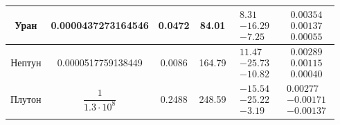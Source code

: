 \begin{table}
\begin{tabular}{@{}c c c c c c@{}}
		\midrule
		
		Уран &
		0.0000437273164546 &
		0.0472 &
		84.01 &
		$\begin{aligned}
			8.31\\
			-16.29\\
			-7.25
		\end{aligned}$ &
		$\begin{aligned}
			0.00354\\
			0.00137\\
			0.00055
		\end{aligned}$ \\
		
		\midrule
		
		Нептун &
		0.0000517759138449 &
		0.0086 &
		164.79 &
		$\begin{aligned}
			11.47\\
			-25.73\\
			-10.82
		\end{aligned}$ &
		$\begin{aligned}
			0.00289\\
			0.00115\\
			0.00040
		\end{aligned}$ \\
		
		\midrule
		
		Плутон &
		$\dfrac{1}{1.3\cdot10^8}$ &
		0.2488 &
		248.59 &
		$\begin{aligned}
			-15.54\\
			-25.22\\
			-3.19
		\end{aligned}$ &
		$\begin{aligned}
			0.00277\\
			-0.00171\\
			-0.00137
		\end{aligned}$ \\
		
		\bottomrule
	\end{tabular}
\end{table}
